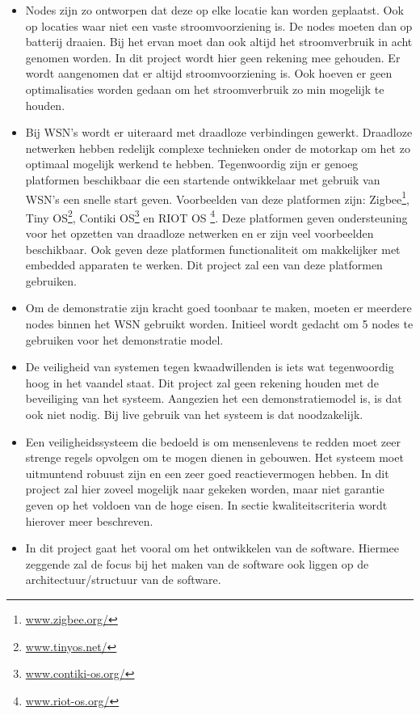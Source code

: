 \documentclass{../local}
\begin{document}
\begin{itemize}
\item Nodes zijn zo ontworpen dat deze op elke locatie kan worden geplaatst. Ook op locaties waar niet een vaste stroomvoorziening is. De nodes moeten dan op batterij draaien. Bij het ervan moet dan ook altijd het stroomverbruik in acht genomen worden. In dit project wordt hier geen rekening mee gehouden. Er wordt aangenomen dat er altijd stroomvoorziening is. Ook hoeven er geen optimalisaties worden gedaan om het stroomverbruik zo min mogelijk te houden.

\item Bij WSN's wordt er uiteraard met draadloze verbindingen gewerkt. Draadloze netwerken hebben 
redelijk complexe technieken onder de motorkap om het zo optimaal mogelijk werkend te hebben. Tegenwoordig zijn er genoeg platformen beschikbaar die een startende ontwikkelaar met gebruik van WSN's een snelle start geven. Voorbeelden van deze platformen zijn: Zigbee\footnote{\url{www.zigbee.org/}}, Tiny OS\footnote{\url{www.tinyos.net/}}, Contiki OS\footnote{\url{www.contiki-os.org/}} en RIOT OS \footnote{\url{www.riot-os.org/}}. Deze platformen geven ondersteuning voor het opzetten van draadloze netwerken en er zijn veel voorbeelden beschikbaar. Ook geven deze platformen functionaliteit om makkelijker met embedded apparaten te werken. Dit project zal een van deze platformen gebruiken. 

\item Om de demonstratie zijn kracht goed toonbaar te maken, moeten er meerdere nodes binnen het WSN gebruikt worden. Initieel wordt gedacht om 5 nodes te gebruiken voor het demonstratie model.

\item De veiligheid van systemen tegen kwaadwillenden is iets wat tegenwoordig hoog in het vaandel staat. Dit project zal geen rekening houden met de beveiliging van het systeem. Aangezien het een demonstratiemodel is, is dat ook niet nodig. Bij live gebruik van het systeem is dat noodzakelijk.

\item Een veiligheidssysteem die bedoeld is om mensenlevens te redden moet zeer strenge regels opvolgen om te mogen dienen in gebouwen. Het systeem moet uitmuntend robuust zijn en een zeer goed reactievermogen hebben. In dit project zal hier zoveel mogelijk naar gekeken worden, maar niet garantie geven op het voldoen van de hoge eisen. In sectie kwaliteitscriteria wordt hierover meer beschreven.

\item In dit project gaat het vooral om het ontwikkelen van de software. Hiermee zeggende zal de focus bij het maken van de software ook liggen op de architectuur/structuur van de software.
\end{itemize}
\end{document}
